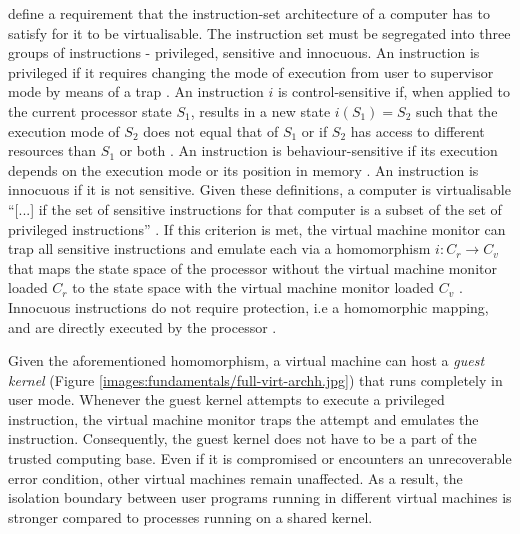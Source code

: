 \textcite{10.1145/361011.361073} define a requirement that the instruction-set architecture of a computer
has to satisfy for it to be virtualisable. The instruction set must be segregated into three groups of
instructions - privileged, sensitive and innocuous. An instruction is privileged if it requires changing
the mode of execution from user to supervisor mode by means of a trap \cite{10.1145/361011.361073}. 
An instruction $i$ is control-sensitive if, when applied to the current processor state $S_1$, results
in a new state $i(S_{1}) = S_{2}$ such that the execution mode of $S_{2}$ does not equal that of $S_{1}$
or if $S_{2}$ has access to different resources than $S_1$ or both \cite{10.1145/361011.361073}. 
An instruction is behaviour-sensitive if its execution depends on the execution mode or its position
in memory \cite{10.1145/361011.361073}. An instruction is innocuous if it is not sensitive. 
Given these definitions, a computer is virtualisable \enquote{[...] if the set of sensitive instructions
for that computer is a subset of the set of privileged instructions} \cite[6]{10.1145/361011.361073}.
If this criterion is met, the virtual machine monitor can trap all sensitive instructions and emulate 
each via a homomorphism $i: C_{r} \rightarrow C_{v}$ that maps the state space of the processor without
the virtual machine monitor loaded $C_{r}$ to the state space with the virtual machine monitor loaded 
$C_{v}$ \cite{10.1145/361011.361073}. Innocuous instructions do not require protection, i.e a homomorphic
mapping, and are directly executed by the processor \cite{10.1145/361011.361073}.

Given the aforementioned homomorphism, a virtual machine can host a \textit{guest kernel} (Figure \ref{images:fundamentals/full-virt-archh.jpg}) that 
runs completely in user mode. 
Whenever the guest kernel attempts to execute a privileged instruction, 
the virtual machine monitor traps the attempt and emulates the instruction. 
Consequently, the guest kernel does not have to be a part of the trusted computing base. 
Even if it is compromised or encounters an unrecoverable error condition, other virtual machines 
remain unaffected. As a result, the isolation boundary between user programs running in different 
virtual machines is stronger compared to processes running on a shared kernel. 

